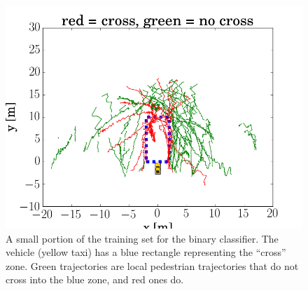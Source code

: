 \begin{figure}
	\centering
	\includegraphics [trim=0 0 0 0, clip, angle=0, width=0.8\columnwidth,
	keepaspectratio]{figures/training_set}
	\caption{A small portion of the training set for the binary classifier. The vehicle (yellow taxi) has a blue rectangle representing the ``cross'' zone. Green trajectories are local pedestrian trajectories that do not cross into the blue zone, and red ones do.} 
	\label{fig:training_set} 
\end{figure}



